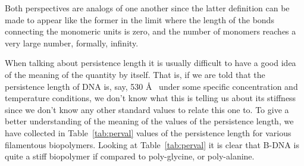 Both  perspectives  are  analogs  of  one  another  since  the  latter
definition can  be made to appear  like the former in  the limit where
the length  of the bonds connecting  the monomeric units  is zero, and
the  number  of  monomers  reaches  a  very  large  number,  formally,
infinity.

When talking about persistence length  it is usually difficult to have
a good idea of  the meaning of the quantity by itself.  That is, if we
are told  that the persistence length  of DNA is, say,  530 \AA~ under
some specific concentration and  temperature conditions, we don't know
what this  is telling us about  its stiffness since we  don't know any
other  standard  values  to relate  this  one  to.  To give  a  better
understanding of the meaning of  the values of the persistence length,
we have collected in  Table~\ref{tab:perval} values of the persistence
length    for   various    filamentous   biopolymers.     Looking   at
Table~\ref{tab:perval}  it  is  clear  that  B-DNA is  quite  a  stiff
biopolymer if compared to poly-glycine, or poly-alanine.

